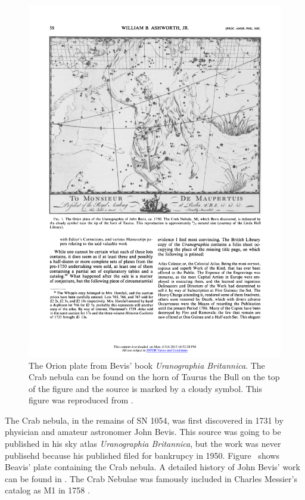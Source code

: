 \begin{figure}[htbp]
  \centering
  \includegraphics[width=\textwidth]{chapters/introduction/figures/bevis_crab.pdf}
  \caption{The Orion plate from Bevis' book {\em Uranographia Britannica}.
  The Crab nebula can be found on the horn of Taurus the Bull 
  on the top of the figure and the source is marked by a 
  cloudy symbol.
  This figure was reproduced from \cite{ashworth_1981_bevis-uranographia}.}
\end{figure}

The Crab nebula, in the remains of SN 1054,
was first discovered in 1731 by physician and amateur astronomer
John Bevis.  This source was going to be published in his sky atlas
{\em Uranographia Britannica}, but the work was never publisehd because
his published filed for bankrupcy in 1950.  Figure~
shows Beavis' plate containing the Crab nebula.  A detailed history of
John Bevis' work can be found in \cite{ashworth_1981_bevis-uranographia}.
The Crab Nebulae was famously included in Charles Messier's catalog as
M1 in 1758 \cite{hester_2008_nebula:-astrophysical}.

